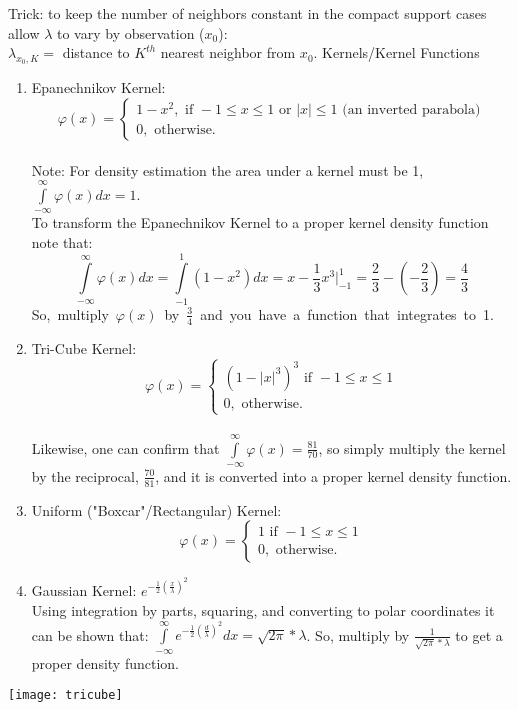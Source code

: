 \documentclass[11pt,letterpaper,english,fleqn]{article} %
\begin{document}
\medskip
Trick: to keep the number of neighbors constant in the compact support cases allow $\lambda$ to vary by observation ($x_0$):
\\
$\lambda_{x_0, K} = $ distance to $K^{th}$ nearest neighbor from $x_0$.
\newpage
\noindent Kernels/Kernel Functions 
\begin{enumerate}
\item Epanechnikov Kernel:\\
$$\varphi (x) = \begin{cases}
               1 - x ^2,\text{ if } -1 \le x \le 1 \text{ or }  |x| \le 1 \text{ (an inverted parabola})\\
               0, \text{ otherwise.}
            \end{cases}$$
\\Note: For density estimation the area under a kernel must be 1, 
\mbox{$\int\limits_{-\infty}^{\infty} \varphi (x) dx = 1$.}
\\
To transform the Epanechnikov Kernel to a proper kernel density function note that:
$$\int\limits_{-\infty}^{\infty} \varphi (x) dx = \int\limits_{-1}^{1} (1-x^2 )dx = x - \frac{1}{3}x^3\bigg\rvert_{-1}^1 = \frac{2}{3}-\left(-\frac{2}{3}\right) = \frac{4}{3}$$
\mbox{So, multiply $\varphi (x)$ by $\frac{3}{4}$ and you have a function that integrates to 1.}
\item Tri-Cube Kernel:\\
$$\varphi (x) = \begin{cases}
               (1 - |x|^3 )^3 \text{ if }-1 \le x \le 1 \\
               0, \text{ otherwise.}
            \end{cases}$$
\\
Likewise, one can confirm that $\int\limits_{-\infty}^{\infty} \varphi (x) = \frac{81}{70}$, so simply multiply the kernel by the reciprocal, $\frac{70}{81}$, and it is converted into a proper kernel density function.
\item Uniform ("Boxcar"/Rectangular) Kernel:
$$\varphi (x) = \begin{cases}
               1 \text{ if }-1 \le x \le 1 \\
               0, \text{ otherwise.}
            \end{cases}$$
\item Gaussian Kernel: $e^{-\frac{1}{2}\left(\frac{x}{\lambda}\right)^2}$\\
Using integration by parts, squaring, and converting to polar coordinates it can be shown that: $\int\limits_{-\infty}^{\infty} e^{-\frac{1}{2}\left(\frac{d}{\lambda}\right)^2} dx = \sqrt{2\pi}*\lambda$. So, multiply by $\frac{1}{\sqrt{2\pi}*\lambda}$ to get a proper density function.
\end{enumerate}
\texttt{[image: tricube]}
\end{document}
